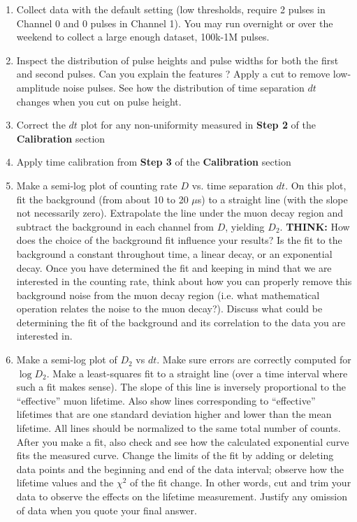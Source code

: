 \documentclass{../lab}
\begin{document}
\begin{enumerate}
    \item Collect data with the default setting (low thresholds, require 2 pulses in Channel 0 and 0 pulses in Channel 1). You may run overnight or over the weekend to collect a large enough dataset, 100k-1M pulses.

    \item Inspect the distribution of pulse heights and pulse widths for both the first and second pulses. Can you explain the features ? Apply a cut to remove low-amplitude noise pulses. See how the distribution of time separation $dt$ changes when you cut on pulse height.

    \item Correct the $dt$ plot for any non-uniformity measured in \textbf{Step 2} of the \textbf{Calibration} section

    \item Apply time calibration from \textbf{Step 3} of the \textbf{Calibration} section

    \item Make a semi-log plot of counting rate $D$ vs. time separation $dt$. On this plot, fit the background (from about 10 to 20 $\mu $s) to a straight line (with the slope not necessarily zero). Extrapolate the line under the muon decay region and subtract the background in each channel from $D$, yielding $D_2$. \textbf{THINK:} How does the choice of the background fit influence your results? Is the fit to the background a constant throughout time, a linear decay, or an exponential decay. Once you have determined the fit and keeping in mind that we are interested in the counting rate, think about how you can properly remove this background noise from the muon decay region (i.e. what mathematical operation relates the noise to the muon decay?). Discuss what could be determining the fit of the background and its correlation to the data you are interested in.

    \item Make a semi-log plot of $D_2$ vs $dt$. Make sure errors are correctly computed for $\log D_2$. Make a least-squares fit to a straight line (over a time interval where such a fit makes sense). The slope of this line is inversely proportional to the ``effective'' muon lifetime. Also show lines corresponding to ``effective'' lifetimes that are one standard deviation higher and lower than the mean lifetime. All lines should be normalized to the same total number of counts. After you make a fit, also check and see how the calculated exponential curve fits the measured curve. Change the limits of the fit by adding or deleting data points and the beginning and end of the data interval; observe how the lifetime values and the $\chi^2$ of the fit change. In other words, cut and trim your data to observe the effects on the lifetime measurement. Justify any omission of data when you quote your final answer.


\end{enumerate}
\end{document}
